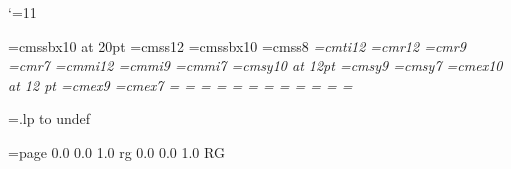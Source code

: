 \catcode`\@=11


\parindent0pt		%
\parskip0pt		%

%
%
\font\titlefont=cmssbx10 at 20pt %
\font\normalfont=cmss12          %
\font\slidetitlefont=cmssbx10    %
\font\linkbarfont=cmss8          %
\font\it=cmti12
%
\baselineskip=15pt
\font\tfont=cmr12
\font\sfont=cmr9
\font\ssfont=cmr7
\font\tifont=cmmi12
\font\sifont=cmmi9
\font\ssifont=cmmi7
\font\tsyfont=cmsy10 at 12pt
\font\ssyfont=cmsy9
\font\sssyfont=cmsy7
\font\texfont=cmex10 at 12 pt
\font\sexfont=cmex9
\font\ssexfont=cmex7
%
=\tfont
{}=\sfont
{}=\ssfont
{}=\tifont
{}=\sifont
{}=\ssifont
{}=\tsyfont
{}=\ssyfont
{}=\sssyfont
{}=\texfont
{}=\sexfont
{}=\ssexfont
%

%
%
\newwrite\wl@stpage
\newread\rl@stpage
\def\bye{%
\immediate\openout\wl@stpage=\jobname.lp%
\write\wl@stpage{\the\pageno}%
\closeout\wl@stpage
\par\vfill
\supereject
\end
}
\def\LP{undef}
\openin\rl@stpage=\jobname.lp
\ifeof\rl@stpage\closein\rl@stpage{}
\else\read\rl@stpage to \LP\fi

%
%

\def\backgroundcolour{1.0 1.0 1.0}    %
\def\textcolour{0.0 0.0 1.0}          %
\def\attentioncolour{1 0 0}           %

\newdimen\vsh@ft %
\newdimen\hsh@ft %
\vsh@ft=-13mm
\hsh@ft=-5mm

\def\bl@nk{ }  %
\newcount\colst@ck
\colst@ck=\pdfcolorstackinit page {\textcolour\bl@nk rg \textcolour\bl@nk RG} %
\def\popst@ck{\pdfcolorstack\colst@ck pop}
\def\setcolour#1{\pdfcolorstack\colst@ck push {#1 rg #1 RG}\aftergroup\popst@ck}
\long\def\coloured#1#2{{\setcolour#1#2}}
\long\def\att#1{\coloured\attentioncolour{#1}}
\def\bgc@lset{\relax}
\def\setbgcolour#1{\def\bgc@lset{\begingroup\pdfcolorstack\colst@ck push {#1 rg #1 RG}\aftergroup\popst@ck
\vbox to 0pt{\kern\vsh@ft\hbox to 0pt{%
\kern\hsh@ft\vrule depth0pt height\pdfpageheight width\pdfpagewidth\hss}\vss}
\nointerlineskip
\endgroup}}



